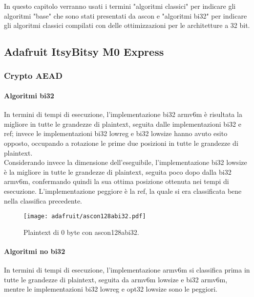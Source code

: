 \noindent In questo capitolo verranno usati i termini "algoritmi classici" per indicare gli algoritmi "base" che sono stati presentati da ascon e "algoritmi bi32" per indicare gli algoritmi classici compilati con delle ottimizzazioni per le architetture a 32 bit.

\subsection{Adafruit ItsyBitsy M0 Express}

\subsubsection{Crypto AEAD}

\paragraph{Algoritmi bi32}

In termini di tempi di esecuzione, l'implementazione bi32 armv6m è risultata la migliore in tutte le grandezze di plaintext, seguita dalle implementazioni bi32 e ref; invece le implementazioni bi32 lowreg e bi32 lowsize hanno avuto esito opposto, occupando a rotazione le prime due posizioni in tutte le grandezze di plaintext. \\

\noindent Considerando invece la dimensione dell'eseguibile, l'implementazione bi32 lowsize è la migliore in tutte le grandezze di plaintext, seguita poco dopo dalla bi32 armv6m, confermando quindi la sua ottima posizione ottenuta nei tempi di esecuzione. L'implementazione peggiore è la ref, la quale si era classificata bene nella classifica precedente.

\begin{figure}[H]
    \centering
    \texttt{[image: adafruit/ascon128abi32.pdf]}
    \caption{Plaintext di 0 byte con ascon128abi32.}
\end{figure}

\paragraph{Algoritmi no bi32}

In termini di tempi di esecuzione, l'implementazione armv6m si classifica prima in tutte le grandezze di plaintext, seguita da armv6m lowsize e bi32 armv6m, mentre le implementazioni bi32 lowreg e opt32 lowsize sono le peggiori. \\

